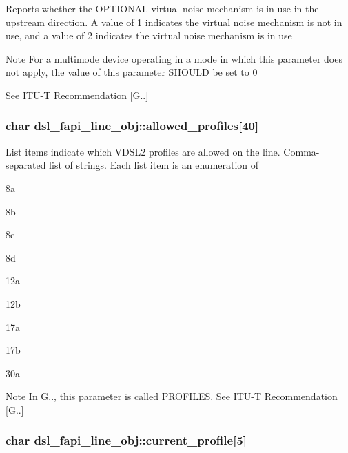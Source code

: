 Reports whether the O\-P\-T\-I\-O\-N\-A\-L virtual noise mechanism is in use in the upstream direction. A value of 1 indicates the virtual noise mechanism is not in use, and a value of 2 indicates the virtual noise mechanism is in use \begin{DoxyNote}{Note}
For a multimode device operating in a mode in which this parameter does not apply, the value of this parameter S\-H\-O\-U\-L\-D be set to 0 

See I\-T\-U-\/\-T Recommendation \mbox{[}G..\mbox{]} 
\end{DoxyNote}
\hypertarget{structdsl__fapi__line__obj_a59c5f2224ed0757a95e6ebde1d37e560}{
\subsubsection[{allowed\-\_\-profiles}]{\setlength{\rightskip}{0pt plus 5cm}char dsl\-\_\-fapi\-\_\-line\-\_\-obj\-::allowed\-\_\-profiles\mbox{[}40\mbox{]}}}\label{structdsl__fapi__line__obj_a59c5f2224ed0757a95e6ebde1d37e560}
List items indicate which V\-D\-S\-L2 profiles are allowed on the line. Comma-\/separated list of strings. Each list item is an enumeration of
\begin{DoxyItemize}
\item 8a
\item 8b
\item 8c
\item 8d
\item 12a
\item 12b
\item 17a
\item 17b
\item 30a \begin{DoxyNote}{Note}
In G.., this parameter is called P\-R\-O\-F\-I\-L\-E\-S. See I\-T\-U-\/\-T Recommendation \mbox{[}G..\mbox{]} 
\end{DoxyNote}

\end{DoxyItemize}\hypertarget{structdsl__fapi__line__obj_a6561ecbfe02e86e5bd2c3ff382bfbd48}{
\subsubsection[{current\-\_\-profile}]{\setlength{\rightskip}{0pt plus 5cm}char dsl\-\_\-fapi\-\_\-line\-\_\-obj\-::current\-\_\-profile\mbox{[}5\mbox{]}}}\label{structdsl__fapi__line__obj_a6561ecbfe02e86e5bd2c3ff382bfbd48}
